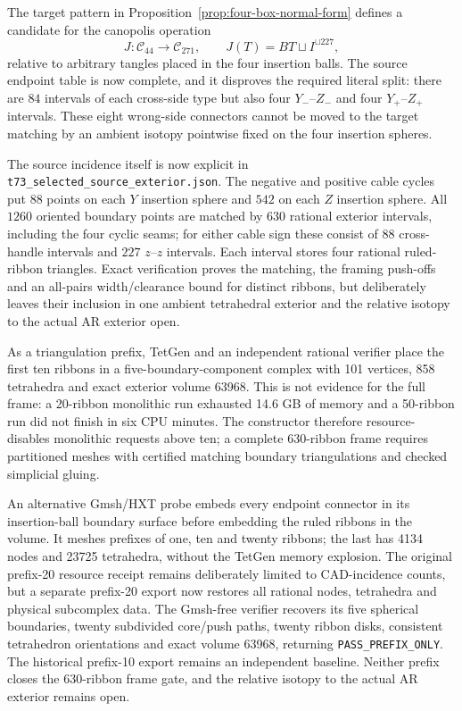 \documentclass[11pt]{amsart}
\theoremstyle{definition}
\theoremstyle{remark}
\begin{document}
The target pattern in Proposition~\ref{prop:four-box-normal-form} defines a
candidate for the canopolis operation
\[
J:\mathcal C_{44}\longrightarrow\mathcal C_{271},
\qquad J(T)=BT\sqcup I^{\sqcup227},
\]
relative to arbitrary tangles placed in the four insertion balls.  The source
endpoint table is now complete, and it disproves the required literal split:
there are $84$ intervals of each cross-side type but also four
$Y_-$--$Z_-$ and four $Y_+$--$Z_+$ intervals.  These eight wrong-side
connectors cannot be moved to the target matching by an ambient isotopy
pointwise fixed on the four insertion spheres.

The source incidence itself is now explicit in
\texttt{t73\_selected\_source\_exterior.json}.  The negative and positive
cable cycles put $88$ points on each $Y$ insertion sphere and $542$ on each
$Z$ insertion sphere.  All $1260$ oriented boundary points are matched by
$630$ rational exterior intervals, including the four cyclic seams; for
either cable sign these consist of $88$ cross-handle intervals and $227$
$z$--$z$ intervals.  Each interval stores four rational ruled-ribbon
triangles.  Exact verification proves the matching, the framing push-offs and
an all-pairs width/clearance bound for distinct ribbons, but deliberately
leaves their inclusion in one ambient tetrahedral exterior and the relative
isotopy to the actual AR exterior open.

As a triangulation prefix, TetGen and an independent rational verifier place
the first ten ribbons in a five-boundary-component complex with 101 vertices,
858 tetrahedra and exact exterior volume 63968.  This is not evidence for the
full frame: a 20-ribbon monolithic run exhausted 14.6 GB of memory and a
50-ribbon run did not finish in six CPU minutes.  The constructor therefore
resource-disables monolithic requests above ten; a complete 630-ribbon frame
requires partitioned meshes with certified matching boundary triangulations
and checked simplicial gluing.

An alternative Gmsh/HXT probe embeds every endpoint connector in its
insertion-ball boundary surface before embedding the ruled ribbons in the
volume.  It meshes prefixes of one, ten and twenty ribbons; the last has 4134
nodes and 23725 tetrahedra, without the TetGen memory explosion.  The original
prefix-20 resource receipt remains deliberately limited to CAD-incidence
counts, but a separate prefix-20 export now restores all rational nodes,
tetrahedra and physical subcomplex data.  The Gmsh-free verifier recovers its
five spherical boundaries, twenty subdivided core/push paths, twenty ribbon
disks, consistent tetrahedron orientations and exact volume 63968, returning
\texttt{PASS\_PREFIX\_ONLY}.  The historical prefix-10 export remains an
independent baseline.  Neither prefix closes the 630-ribbon frame gate, and
the relative isotopy to the actual AR exterior remains open.
\end{document}
